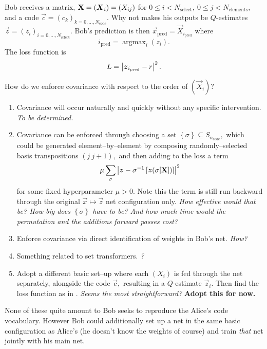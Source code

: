\documentclass[12pt]{article}
\begin{document}
Bob receives a matrix, $\mathbf{X} = (\boldsymbol{X}_{i}) = (X_{ij})$ for $0\leq i < N_\text{select},\ 0\leq j < N_\text{elements},$ and a code $\vec{c}=(c_k)_{k=0,...,N_\text{code}}.$  Why not makes his outputs be $Q$-estimates $\vec{z} = (z_i)_{i=0,...,N_\text{select}}.$ Bob's prediction is then
$
	\vec{x}_\text{pred}
=
\vec{X}_{i_\text{pred}}
$
where
\begin{equation}
	i_\text{pred}
	=
	\operatorname{argmax}_{i}  (z_i)
	.
\end{equation}
The loss function is 
\begin{equation}	\label{eq:Bob_loss_fn}
	L
	=
	\left\lvert \boldsymbol{z}_{i_\text{pred}} -r \right\rvert^2
	. 
\end{equation}

How do we enforce covariance with respect to the order of $(\vec{X}_{i})$?
\begin{enumerate}
	\item Covariance will occur naturally and quickly without any specific intervention.  {\em To be determined.}
	\item Covariance can be enforced through choosing a set $\left\lbrace \sigma \right\rbrace \subseteq S_{n_\text{code}},$ which could be generated element--by--element by composing randomly--selected basis transpositions $(j\ j+1),$ and then adding to the loss a term
	\begin{equation}
		\mu\sum_\sigma\left\lvert \boldsymbol{z} - \sigma^{-1}\left[\boldsymbol{z}(\sigma[\mathbf{X}])\right] \right\rvert^2
	\end{equation}
	for some fixed hyperparameter $\mu > 0.$  Note this the term is still run backward through the original $\vec{x}\mapsto\vec{z}$ net configuration only.  {\em How effective would that be?  How big does $\left\lbrace \sigma \right\rbrace$ have to be? And how much time would the permutation and the additions forward passes cost?}
	\item Enforce covariance via direct identification of weights in Bob's net.  {\em How?}
	\item Something related to set transformers. {\em ?}
	\item Adopt a different basic set--up where each $(X_i)$ is fed through the net separately, alongside the code $\vec{c},$ resulting in a $Q$-estimate $\vec{z}_i.$  Then find the loss function as in .  {\em Seems the most straightforward?} {\bf Adopt this for now.}
\end{enumerate}
None of these quite amount to Bob seeks to reproduce the Alice's code vocabulary.  However Bob could additionally set up a net in the same basic configuration as Alice's (he doesn't know the weights of course) and train {\em that} net jointly with his main net.




\end{document}
